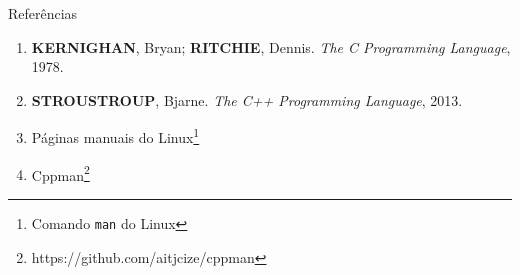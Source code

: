 \begin{frame}[fragile]{Referências}

    \begin{enumerate}

        \item \textbf{KERNIGHAN}, Bryan; \textbf{RITCHIE}, Dennis. \textit{The C Programming Language}, 1978.

        \item \textbf{STROUSTROUP}, Bjarne. \textit{The C++ Programming Language}, 2013.


        \item Páginas manuais do Linux\footnote{Comando \texttt{man} do Linux}

        \item Cppman\footnote{https://github.com/aitjcize/cppman}

    \end{enumerate}

\end{frame}

